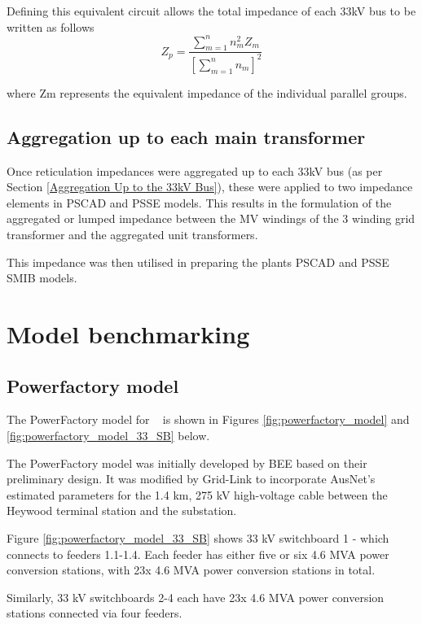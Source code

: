 \documentclass{../grid-link-report}
\begin{document}
	Defining this equivalent circuit allows the total impedance of each 33kV bus to be written as follows
	\begin{equation}
		Z_{p} = \frac{\sum_{m=1}^{n}n_{m}^{2}Z_{m}}
					 {[\sum_{m=1}^{n}n_{m}]^2}
	\end{equation}
	
	where Zm represents the equivalent impedance of the individual parallel groups. 
	
	\section{Aggregation up to each main transformer}	
	Once reticulation impedances were aggregated up to each 33kV bus (as per Section \ref{Aggregation Up to the 33kV Bus}), these were applied to two impedance elements in PSCAD and PSSE models. This results in the formulation of the aggregated or lumped impedance between the MV windings of the 3 winding grid transformer and the aggregated unit transformers.
	
	This impedance was then utilised in preparing the plants PSCAD and PSSE \ac{SMIB} models.

	\chapter{Model benchmarking}
	
	\section{Powerfactory model}
	The PowerFactory model for \project ~ is shown in Figures \ref{fig:powerfactory_model} and \ref{fig:powerfactory_model_33_SB} below. 
	
	The PowerFactory model was initially developed by BEE based on their preliminary design. It was modified by Grid-Link to incorporate AusNet's estimated parameters for the 1.4 km, 275 kV high-voltage cable between the Heywood terminal station and the substation. 
	
	Figure \ref{fig:powerfactory_model_33_SB} shows 33 kV switchboard 1 - which connects to feeders 1.1-1.4. Each feeder has either five or six 4.6 MVA power conversion stations, with 23x 4.6 MVA power conversion stations in total.
	
	Similarly, 33 kV switchboards 2-4 each have 23x 4.6 MVA power conversion stations connected via four feeders.
	
\end{document}
